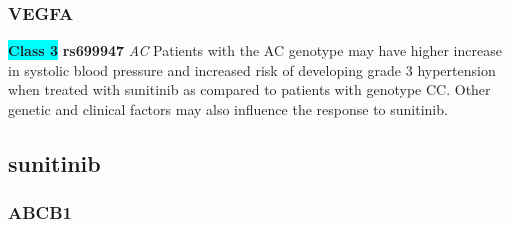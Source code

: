 \documentclass{book}
\begin{document}
\subsubsection{ VEGFA }

\begin{center}
\textbf{\colorbox{cyan} {Class 3}} \textbf{ rs699947 } \textit{ AC }
Patients with the AC genotype may have higher increase in systolic blood pressure and increased risk of developing grade 3 hypertension when treated with sunitinib as compared to patients with genotype CC. Other genetic and clinical factors may also influence the response to sunitinib.


\end{center}\subsection{ sunitinib }


\subsubsection{ ABCB1 }
\end{document}
